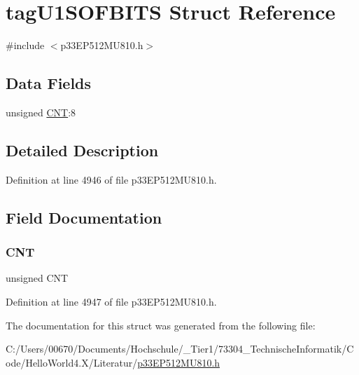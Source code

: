 \hypertarget{structtag_u1_s_o_f_b_i_t_s}{}\section{tag\+U1\+S\+O\+F\+B\+I\+TS Struct Reference}
\label{structtag_u1_s_o_f_b_i_t_s}


{\ttfamily \#include $<$p33\+E\+P512\+M\+U810.\+h$>$}

\subsection*{Data Fields}
\begin{DoxyCompactItemize}
\item 
unsigned \hyperlink{structtag_u1_s_o_f_b_i_t_s_a30be39d82c244f19fd98dd74227487f6}{C\+NT}\+:8
\end{DoxyCompactItemize}


\subsection{Detailed Description}


Definition at line 4946 of file p33\+E\+P512\+M\+U810.\+h.



\subsection{Field Documentation}
\mbox{\label{structtag_u1_s_o_f_b_i_t_s_a30be39d82c244f19fd98dd74227487f6}} 
\subsubsection{\texorpdfstring{C\+NT}{CNT}}
{\footnotesize\ttfamily unsigned C\+NT}



Definition at line 4947 of file p33\+E\+P512\+M\+U810.\+h.



The documentation for this struct was generated from the following file\+:\begin{DoxyCompactItemize}
\item 
C\+:/\+Users/00670/\+Documents/\+Hochschule/\+\_\+\+Tier1/73304\+\_\+\+Technische\+Informatik/\+Code/\+Hello\+World4.\+X/\+Literatur/\hyperlink{p33_e_p512_m_u810_8h}{p33\+E\+P512\+M\+U810.\+h}\end{DoxyCompactItemize}
